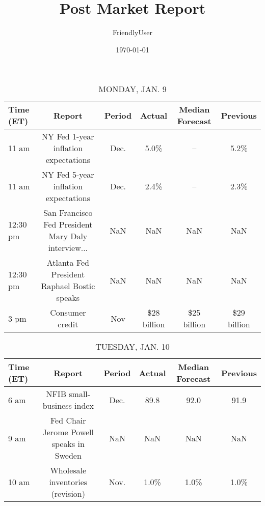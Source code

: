 \documentclass{article}%
\title{Post Market Report}%
\author{FriendlyUser}%
\date{\today}%
\begin{document}
%
\normalsize%


\begin{table}[htbp]%
\caption{MONDAY, JAN. 9}%
\centering%
\begin{adjustbox}{width=1\textwidth}%
\begin{tabular}{lccccc}
\toprule
Time (ET) &                                             Report & Period &      Actual & Median Forecast &    Previous \\
\midrule
    11 am &               NY Fed 1-year inflation expectations &   Dec. &        5.0\% &              -- &        5.2\% \\
    11 am &               NY Fed 5-year inflation expectations &   Dec. &        2.4\% &              -- &        2.3\% \\
 12:30 pm & San Francisco Fed President Mary Daly interview... &    NaN &         NaN &             NaN &         NaN \\
 12:30 pm &        Atlanta Fed President Raphael Bostic speaks &    NaN &         NaN &             NaN &         NaN \\
     3 pm &                                    Consumer credit &    Nov & \$28 billion &     \$25 billion & \$29 billion \\
\bottomrule
\end{tabular}
%
\end{adjustbox}%
\end{table}

%


\begin{table}[htbp]%
\caption{TUESDAY, JAN. 10}%
\centering%
\begin{adjustbox}{width=1\textwidth}%
\begin{tabular}{lccccc}
\toprule
Time (ET) &                                   Report & Period & Actual & Median Forecast & Previous \\
\midrule
     6 am &                NFIB small-business index &   Dec. &   89.8 &            92.0 &     91.9 \\
     9 am & Fed Chair Jerome Powell speaks in Sweden &    NaN &    NaN &             NaN &      NaN \\
    10 am &         Wholesale inventories (revision) &   Nov. &   1.0\% &            1.0\% &     1.0\% \\
\bottomrule
\end{tabular}
%
\end{adjustbox}%
\end{table}
\end{document}
